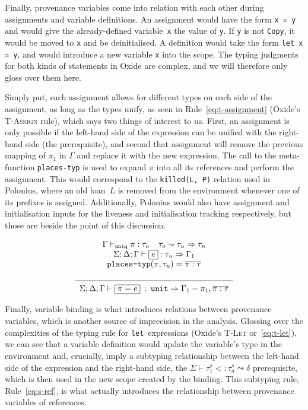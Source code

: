 \documentclass[11pt,a4paper,twoside,openany]{report}
\newcommand{\InRust}[1]{\texttt{#1}}
\newcommand{\InDatalog}[1]{\texttt{#1}}
\newcommand{\expression}[1]{\boxed{#1}}
\newcommand{\ntyperule}[2]{\begin{array}{c}#1\\\midrule\raisebox{1pt}{\strut}#2\end{array}}
\renewcommand\_{\textunderscore\allowbreak}
\begin{document}
Finally, provenance variables come into relation with each other during
assignments and variable definitions. An assignment would have the form
\InRust{x = y} and would give the already-defined variable~\InRust{x} the value
of \InRust{y}. If \InRust{y} is not \InRust{Copy}, it would be moved to
\InRust{x} and be deinitialised. A definition would take the form \InRust{let x
  = y}, and would introduce a new variable \InRust{x} into the scope. The typing
judgments for both kinds of statements in Oxide are complex, and we will
therefore only gloss over them here.

Simply put, each assignment allows for different types on each side of the
assignment, as long as the types unify, as seen in Rule~\eqref{eq:t-assignment}
(Oxide's \textsc{T-Assign} rule), which says two things of interest to us.
First, an assignment is only possible if the left-hand side of the expression
can be unified with the right-hand side (the prerequisite), and second that
assignment will remove the previous mapping of $\pi_1$ in $\Gamma$ and replace
it with the new expression. The call to the meta-function \texttt{places-typ} is
used to expand $\pi$ into all its references and perform the assignment. This
would correspond to the \InDatalog{killed(L, P)} relation used in Polonius,
where an old loan~$L$ is removed from the environment whenever one of its prefixes
is assigned. Additionally, Polonius would also have assignment and
initialisation inputs for the liveness and initialisation tracking respectively,
but those are beside the point of this discussion.

\begin{equation}\label{eq:t-assignment}
  \ntyperule{
    \Gamma \vdash_{\texttt{uniq}} \pi : \tau_o \:\:\:\:\:
    \tau_o \sim \tau_u \Rightarrow \tau_n \\
    \Sigma ; \Delta ; \Gamma \vdash \expression{e} : \tau_u \Rightarrow \Gamma_1 \\
    \texttt{places-typ}(\pi, \tau_u) = \overline{\pi : \tau} \\
  }
  {
    \Sigma ; \Delta ; \Gamma \vdash \expression{\pi = e} \: : \: \texttt{unit} \Rightarrow \Gamma_1 - \pi_1, \overline{\pi : \tau}
  }
\end{equation}

Finally, variable binding is what introduces relations between provenance
variables, which is another source of imprecision in the analysis. Glossing over
the complexities of the typing rule for \InRust{let}~expressions (Oxide's
\textsc{T-Let} or~\eqref{eq:t-let}), we can see that a variable definition would
update the variable's type in the environment and, crucially, imply a
subtyping relationship between the left-hand side of the expression and the
right-hand side, the $\Sigma \vdash \tau_1 ^s <: \tau_a^s \leadsto \delta$
prerequisite, which is then used in the new scope created by the binding. This
subtyping rule, Rule~\eqref{eq:s-ref}, is what actually introduces the
relationship between provenance variables of references.
\end{document}
